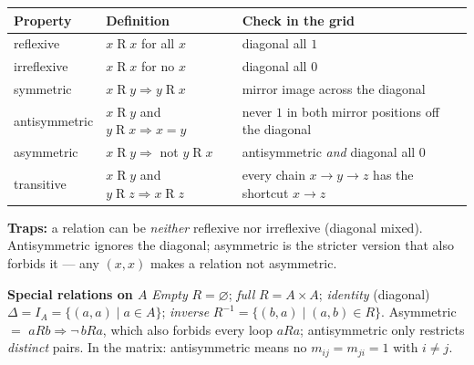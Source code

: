 \documentclass{fkt-notes}
\theoremstyle{definition}
\begin{document}
\begin{rulepar}
  \begin{center}
    \renewcommand{\arraystretch}{1.3}
    \begin{tabular}{@{}lll@{}}
      \toprule
      Property      & Definition                                                          & Check in the grid                                      \\
      \midrule
      reflexive     & $x \mathrel{R} x$ for all $x$                                       & diagonal all $1$                                       \\
      irreflexive   & $x \mathrel{R} x$ for no $x$                                        & diagonal all $0$                                       \\
      symmetric     & $x \mathrel{R} y \Rightarrow y \mathrel{R} x$                       & mirror image across the diagonal                       \\
      antisymmetric & $x \mathrel{R} y$ and $y \mathrel{R} x \Rightarrow x = y$           & never $1$ in both mirror positions off the diagonal    \\
      asymmetric    & $x \mathrel{R} y \Rightarrow$ not $y \mathrel{R} x$                 & antisymmetric \emph{and} diagonal all $0$              \\
      transitive    & $x \mathrel{R} y$ and $y \mathrel{R} z \Rightarrow x \mathrel{R} z$ & every chain $x \to y \to z$ has the shortcut $x \to z$ \\
      \bottomrule
    \end{tabular}
  \end{center}
\end{rulepar}

\noindent \textbf{Traps:} a relation can be \emph{neither} reflexive nor
irreflexive (diagonal mixed). Antisymmetric ignores the diagonal;
asymmetric is the stricter version that also forbids it --- any
$(x, x)$ makes a relation not asymmetric.

\begin{rulepar}
  \textbf{Special relations on $A$} \emph{Empty} $R=\varnothing$;
  \emph{full} $R=A\times A$; \emph{identity} (diagonal)
  $\Delta=I_A=\{(a,a)\mid a\in A\}$; \emph{inverse}
  $R^{-1}=\{(b,a)\mid(a,b)\in R\}$. Asymmetric $=$ $aRb\Rightarrow\neg\,bRa$,
  which also forbids every loop $aRa$; antisymmetric only restricts
  \emph{distinct} pairs. In the matrix: antisymmetric means no $m_{ij}=m_{ji}=1$
  with $i\ne j$.
\end{rulepar}
\end{document}
